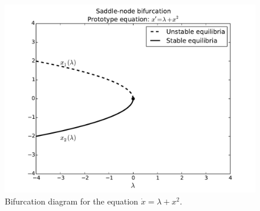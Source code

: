 \begin{figure}
\centering
\includegraphics[width=\textwidth]{SaddleNBifurcation.pdf}
\caption{Bifurcation diagram for the equation $\dot{x} = \lambda + x^2$.}
\label{bifurcation:sn}
\end{figure}

% 
% 
% 
% 

